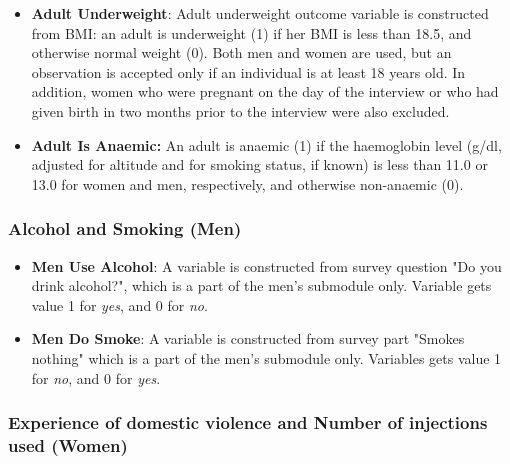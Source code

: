 \documentclass[12pt,a4paper,notitlepage]{article}
\begin{document}
\begin{itemize}
    \item \textbf{Adult Underweight}: Adult underweight outcome variable is constructed from BMI: an adult is underweight (1) if her BMI is less than 18.5, and otherwise normal weight (0). Both men and women are used, but an observation is accepted only if an individual is at least 18 years old. In addition, women who were pregnant on the day of the interview or who had given birth in two months prior to the interview were also excluded.

    \item \textbf{Adult Is Anaemic:} An adult is anaemic (1) if the haemoglobin level (g/dl, adjusted for altitude and for smoking status, if known) is less than 11.0 or 13.0 for women and men, respectively, and otherwise non-anaemic (0).

\end{itemize}

\subsubsection{Alcohol and Smoking (Men)}  \label{subsubsec:alcoholSmoking}

\begin{itemize}
    \item \textbf{Men Use Alcohol}: A variable is constructed from survey question "Do you drink alcohol?", which is a part of the men's submodule only. Variable gets value 1 for \textit{yes}, and 0 for \textit{no}.

    \item \textbf{Men Do Smoke}: A variable is constructed from survey part "Smokes nothing" which is a part of the men's submodule only. Variables gets value 1 for \textit{no}, and 0 for \textit{yes}.
\end{itemize}

\subsubsection{Experience of domestic violence and Number of injections used (Women)} \label{subsubsec:violenceInj}
\end{document}
